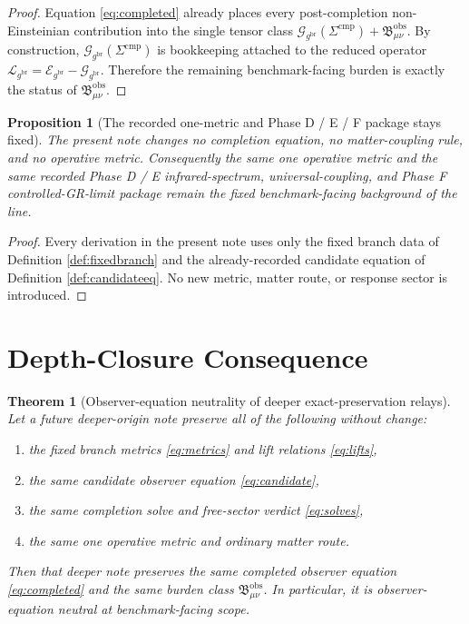 \documentclass[11pt]{article}
\newcommand{\ObserverMetric}{g^{\mathrm{br}}}
\newcommand{\CompShift}{\Sigma^{\mathrm{cmp}}}
\newcommand{\ReducedEin}{\mathcal L_{\ObserverMetric}}
\newcommand{\GaugeBook}{\mathcal G_{\ObserverMetric}}
\newcommand{\EinLin}{\mathcal E_{\ObserverMetric}}
\newcommand{\ObsBurden}{\mathfrak B_{\mu\nu}^{\mathrm{obs}}}
\newtheorem{proposition}{Proposition}
\newtheorem{theorem}{Theorem}
\begin{document}
\begin{proof}
Equation \eqref{eq:completed} already places every post-completion non-Einsteinian contribution into the single tensor class \(\GaugeBook(\CompShift)+\ObsBurden\). By construction, \(\GaugeBook(\CompShift)\) is bookkeeping attached to the reduced operator \(\ReducedEin=\EinLin-\GaugeBook\). Therefore the remaining benchmark-facing burden is exactly the status of \(\ObsBurden\).
\end{proof}

\begin{proposition}[The recorded one-metric and Phase D / E / F package stays fixed]
\label{prop:phases}
The present note changes no completion equation, no matter-coupling rule, and no operative metric. Consequently the same one operative metric and the same recorded Phase D / E infrared-spectrum, universal-coupling, and Phase F controlled-GR-limit package remain the fixed benchmark-facing background of the line.
\end{proposition}

\begin{proof}
Every derivation in the present note uses only the fixed branch data of Definition \ref{def:fixedbranch} and the already-recorded candidate equation of Definition \ref{def:candidateeq}. No new metric, matter route, or response sector is introduced.
\end{proof}

\section{Depth-Closure Consequence}

\begin{theorem}[Observer-equation neutrality of deeper exact-preservation relays]
\label{thm:neutrality}
Let a future deeper-origin note preserve all of the following without change:
\begin{enumerate}
    \item the fixed branch metrics \eqref{eq:metrics} and lift relations \eqref{eq:lifts},
    \item the same candidate observer equation \eqref{eq:candidate},
    \item the same completion solve and free-sector verdict \eqref{eq:solves},
    \item the same one operative metric and ordinary matter route.
\end{enumerate}
Then that deeper note preserves the same completed observer equation \eqref{eq:completed} and the same burden class \(\ObsBurden\). In particular, it is observer-equation neutral at benchmark-facing scope.
\end{theorem}
\end{document}
